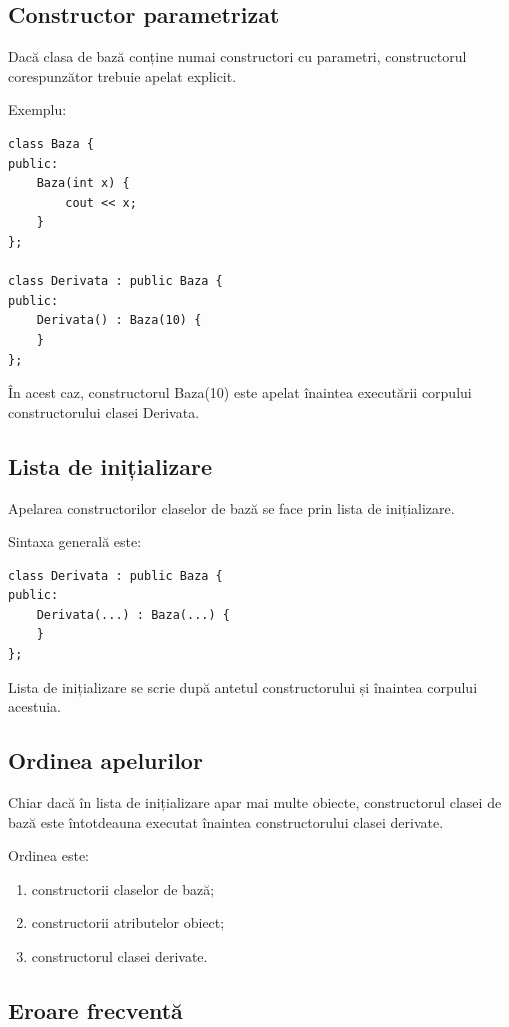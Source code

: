 \documentclass[12pt,a4paper]{article}
\begin{document}
\subsection{Constructor parametrizat}

Dacă clasa de bază conține numai constructori cu parametri, constructorul corespunzător trebuie apelat explicit.

Exemplu:

\begin{verbatim}
class Baza {
public:
    Baza(int x) {
        cout << x;
    }
};

class Derivata : public Baza {
public:
    Derivata() : Baza(10) {
    }
};
\end{verbatim}

În acest caz, constructorul Baza(10) este apelat înaintea executării corpului constructorului clasei Derivata.

\subsection{Lista de inițializare}

Apelarea constructorilor claselor de bază se face prin lista de inițializare.

Sintaxa generală este:

\begin{verbatim}
class Derivata : public Baza {
public:
    Derivata(...) : Baza(...) {
    }
};
\end{verbatim}

Lista de inițializare se scrie după antetul constructorului și înaintea corpului acestuia.

\subsection{Ordinea apelurilor}

Chiar dacă în lista de inițializare apar mai multe obiecte, constructorul clasei de bază este întotdeauna executat înaintea constructorului clasei derivate.

Ordinea este:

\begin{enumerate}
\item constructorii claselor de bază;
\item constructorii atributelor obiect;
\item constructorul clasei derivate.
\end{enumerate}

\subsection{Eroare frecventă}
\end{document}
